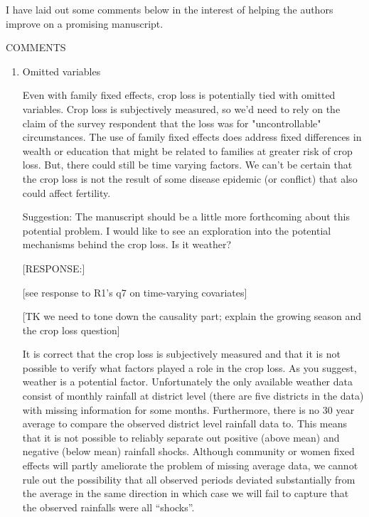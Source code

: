 \documentclass[letterpaper,12pt]{article}
\begin{document}
I have laid out some comments below in the interest of helping the
authors improve on a promising manuscript.


COMMENTS

\begin{enumerate}

\item Omitted variables

Even with family fixed effects, crop loss is potentially tied with
omitted variables. Crop loss is subjectively measured, so we'd need to
rely on the claim of the survey respondent that the loss was for
"uncontrollable" circumstances. The use of family fixed effects does
address fixed differences in wealth or education that might be related
to families at greater risk of crop loss. But, there could still be time
varying factors. We can't be certain that the crop loss is not the
result of some disease epidemic (or conflict) that also could affect
fertility.

Suggestion: The manuscript should be a little more forthcoming about
this potential problem. I would like to see an exploration into the
potential mechanisms behind the crop loss. Is it weather?

[RESPONSE:]

[see response to R1's q7 on time-varying covariates]

[TK we need to tone down the causality part; explain the growing season and
the crop loss question]

It is correct that the crop loss is subjectively measured and that
it is not possible to verify what factors played a role in the crop loss.
As you suggest, weather is a potential factor.
Unfortunately the only available weather data consist of monthly rainfall 
at district level (there are five districts in the data) with missing 
information for some months.
Furthermore, there is no 30 year average to compare the observed 
district level rainfall data to.
This means that it is not possible to reliably separate out positive 
(above mean) and negative (below mean) rainfall shocks.
Although community or women fixed effects will partly ameliorate the
problem of missing average data, we cannot rule out the possibility
that all observed periods deviated substantially from the average in 
the same direction in which case we will fail to capture that the observed
rainfalls were all ``shocks''.


\end{enumerate}
\end{document}
